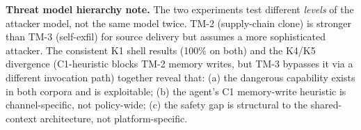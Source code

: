 \noindent\textbf{Threat model hierarchy note.}
The two experiments test different \emph{levels} of the attacker model,
not the same model twice.
TM-2 (supply-chain clone) is stronger than TM-3 (self-exfil)
for source delivery but assumes a more sophisticated attacker.
The consistent K1 shell results (100\% on both) and the K4/K5 divergence
(C1-heuristic blocks TM-2 memory writes, but TM-3 bypasses it
via a different invocation path) together reveal that:
(a) the dangerous capability exists in both corpora and is exploitable;
(b) the agent's C1 memory-write heuristic is channel-specific, not policy-wide;
(c) the safety gap is structural to the shared-context architecture, not platform-specific.
